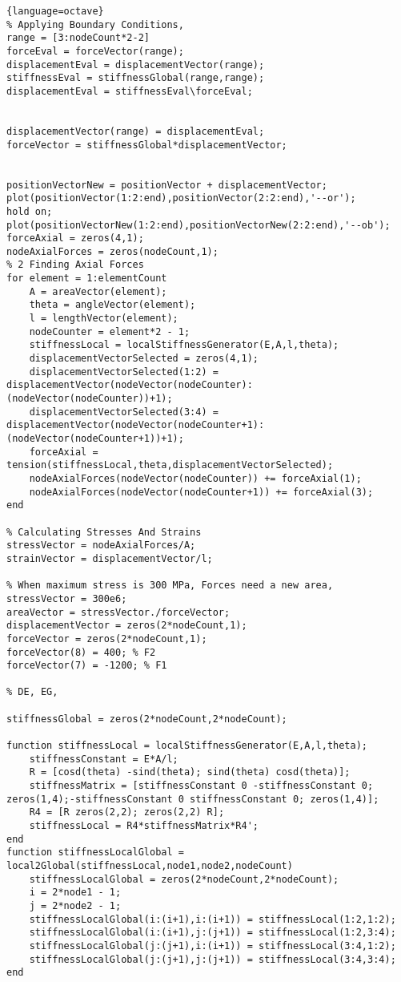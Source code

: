 \documentclass{article}
\begin{document}
\begin{lstlisting}{language=octave}
% Applying Boundary Conditions,
range = [3:nodeCount*2-2]
forceEval = forceVector(range);
displacementEval = displacementVector(range);
stiffnessEval = stiffnessGlobal(range,range);
displacementEval = stiffnessEval\forceEval;


displacementVector(range) = displacementEval;
forceVector = stiffnessGlobal*displacementVector;


positionVectorNew = positionVector + displacementVector;
plot(positionVector(1:2:end),positionVector(2:2:end),'--or');
hold on;
plot(positionVectorNew(1:2:end),positionVectorNew(2:2:end),'--ob');
forceAxial = zeros(4,1);
nodeAxialForces = zeros(nodeCount,1);
% 2 Finding Axial Forces
for element = 1:elementCount
    A = areaVector(element);
    theta = angleVector(element);
    l = lengthVector(element);
    nodeCounter = element*2 - 1;
    stiffnessLocal = localStiffnessGenerator(E,A,l,theta);
    displacementVectorSelected = zeros(4,1);
    displacementVectorSelected(1:2) = displacementVector(nodeVector(nodeCounter):(nodeVector(nodeCounter))+1);
    displacementVectorSelected(3:4) = displacementVector(nodeVector(nodeCounter+1):(nodeVector(nodeCounter+1))+1);
    forceAxial = tension(stiffnessLocal,theta,displacementVectorSelected);
    nodeAxialForces(nodeVector(nodeCounter)) += forceAxial(1);
    nodeAxialForces(nodeVector(nodeCounter+1)) += forceAxial(3);
end

% Calculating Stresses And Strains
stressVector = nodeAxialForces/A;
strainVector = displacementVector/l;

% When maximum stress is 300 MPa, Forces need a new area,
stressVector = 300e6;
areaVector = stressVector./forceVector;
displacementVector = zeros(2*nodeCount,1);
forceVector = zeros(2*nodeCount,1);
forceVector(8) = 400; % F2
forceVector(7) = -1200; % F1

% DE, EG,

stiffnessGlobal = zeros(2*nodeCount,2*nodeCount);

function stiffnessLocal = localStiffnessGenerator(E,A,l,theta);
    stiffnessConstant = E*A/l;
    R = [cosd(theta) -sind(theta); sind(theta) cosd(theta)];
    stiffnessMatrix = [stiffnessConstant 0 -stiffnessConstant 0; zeros(1,4);-stiffnessConstant 0 stiffnessConstant 0; zeros(1,4)];
    R4 = [R zeros(2,2); zeros(2,2) R];
    stiffnessLocal = R4*stiffnessMatrix*R4';
end
function stiffnessLocalGlobal = local2Global(stiffnessLocal,node1,node2,nodeCount)
    stiffnessLocalGlobal = zeros(2*nodeCount,2*nodeCount);
    i = 2*node1 - 1;
    j = 2*node2 - 1;
    stiffnessLocalGlobal(i:(i+1),i:(i+1)) = stiffnessLocal(1:2,1:2);
    stiffnessLocalGlobal(i:(i+1),j:(j+1)) = stiffnessLocal(1:2,3:4);
    stiffnessLocalGlobal(j:(j+1),i:(i+1)) = stiffnessLocal(3:4,1:2);
    stiffnessLocalGlobal(j:(j+1),j:(j+1)) = stiffnessLocal(3:4,3:4);
end


\end{lstlisting}
\end{document}

